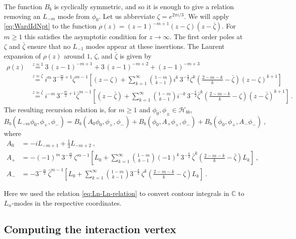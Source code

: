 \documentclass[11pt,a4paper]{article}
\numberwithin{equation}{section}
\begin{document}
\noindent 
The function $B_b$ is cyclically symmetric, and so it is enough to give a relation removing an $L_{-m}$ mode from $\phi_0$.
Let us abbreviate $\zeta = e^{2\pi i/3}$. We will apply \eqref{eq:WardIdNpt} to the function $\rho(z) = (z-1)^{-m+1}(z-\zeta)(z-\bar\zeta)$. For $m\ge 1$ this satisfies the asymptotic condition for $z \to \infty$. The first order poles at $\zeta$ and $\bar\zeta$ ensure that no $L_{-1}$ modes appear at these insertions. The Laurent expansion of $\rho(z)$ around $1$, $\zeta$, and $\bar\zeta$ is given by
%
\begin{align}
\rho(z) 
&\overset{z\approx 1}=
3 \, (z-1)^{-m+1}
+ 3 \, (z-1)^{-m+2}
+ (z-1)^{-m+3}
\nonumber \\
&\overset{z\approx \zeta}= i^m \, 3^{-\frac{m}2+1} \zeta^{m-1} \left[
(z-\zeta) + 
\sum_{k=1}^\infty \binom{1-m}{k-1} i^k \, 3^{-\frac{k}2} \zeta^{k}  \left( \tfrac{2-m-k}k - \bar\zeta \right) (z-\zeta)^{k+1} \right] \nonumber \\
&\overset{z\approx \bar\zeta}= i^{-m} \, 3^{-\frac{m}2+1} \bar\zeta^{m-1} \left[
(z-\bar\zeta) + 
\sum_{k=1}^\infty \binom{1-m}{k-1} i^{-k} \, 3^{-\frac{k}2} \bar\zeta^{k}  \left( \tfrac{2-m-k}k - \zeta \right) (z-\bar\zeta)^{k+1} \right] \,.
\end{align}
%
The resulting recursion relation is, for $m \ge 1$ and $\phi_0,\phi_\pm \in \mathcal{H}_{bb}$,
%
\begin{equation}\label{eq:recusive-relation}
 B_b(L_{-m} \phi_0,\phi_+,\phi_-)
 = 
B_b(A_0 \phi_0,\phi_+,\phi_-)
+
B_b(\phi_0,A_+ \phi_+,\phi_-)
+
B_b(\phi_0,\phi_+,A_- \phi_-)~,
\end{equation}
%
where
%
\begin{align}
A_0 &= -i L_{-m+1} + \tfrac13 L_{-m+2}~,
\nonumber \\
A_+ &= -(-1)^m \, 3^{-\frac{m}2} \, \zeta^{m-1} \left[
L_0 + 
\sum_{k=1}^\infty \binom{1-m}{k-1} (-1)^k \, 3^{-\frac{k}2} \, \bar\zeta^k \left( \frac{2-m-k}k - \bar\zeta \right) L_k \right]~,
\nonumber \\
A_- &= - 3^{-\frac{m}2} \, \bar\zeta^{m-1} \left[
L_0 + 
\sum_{k=1}^\infty \binom{1-m}{k-1}  3^{-\frac{k}2} \, \zeta^k \left( \frac{2-m-k}k - \zeta \right) L_k \right]~.
\end{align}

\noindent
Here we used the relation \eqref{eq:Ln-Ln-relation} to convert contour integrals in $\mathbb{C}$ to $L_n$-modes in the respective coordinates.


\subsection{Computing the interaction vertex}
\end{document}
